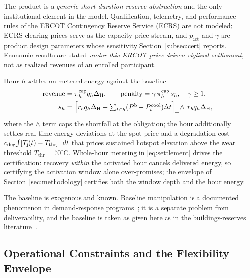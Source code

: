 \begin{remark}\label{rem:market}
The product is a \emph{generic short-duration reserve abstraction} and the
only institutional element in the model. Qualification, telemetry, and performance rules of
the ERCOT Contingency Reserve Service (ECRS) are not modeled; ECRS clearing
prices serve as the capacity-price stream, and $p_{\mathrm{act}}$ and $\gamma$ are product design parameters
whose sensitivity Section~\ref{subsec:cert} reports. Economic results are
stated \emph{under this ERCOT-price-driven stylized settlement}, not as
realized revenues of an enrolled participant.
\end{remark} Hour $h$ settles on metered energy
against the baseline:
\begin{equation}
\begin{aligned}
\text{revenue} &= \pi^{\mathrm{cap}}_h q_h \Delta_{\mathrm{H}},\qquad
\text{penalty} = \gamma\,\pi^{\mathrm{cap}}_h\, s_h,\quad \gamma \ge 1,\\
s_h &= \Bigl[r_h q_h \Delta_{\mathrm{H}} -
\textstyle\sum_{t\in h}(P^{\mathrm{b}}-P^{\mathrm{cool}}_t)\Delta t\Bigr]_+
\!\wedge\, r_h q_h \Delta_{\mathrm{H}},
\end{aligned}
\label{eq:settlement}
\end{equation}
where the $\wedge$ term caps the shortfall at the obligation; the hour
additionally settles real-time energy deviations at the spot price and a
degradation cost $c_{\mathrm{deg}}\!\int[\Tj(t)-T_{\mathrm{thr}}]_+dt$ that
prices sustained hotspot elevation above the wear threshold
$T_{\mathrm{thr}}=70^\circ$C. Whole-hour metering in \eqref{eq:settlement} drives the
certification: recovery \emph{within} the activated hour cancels delivered
energy, so certifying the activation window alone over-promises; the envelope
of Section~\ref{sec:methodology} certifies both the window depth and the hour
energy.

\begin{remark}[Baseline]\label{rem:baseline}
The baseline is exogenous and known. Baseline manipulation is a documented
phenomenon in demand-response programs~\cite{chao2011demand}; it is a
separate problem from deliverability, and the baseline is taken as given
here as in the buildings-reserves literature~\cite{vrettos2016robust}.
\end{remark}

\vspace{-3mm}
\subsection{Operational Constraints and the Flexibility Envelope}
\label{subsec:constraints}

